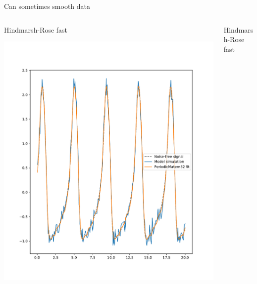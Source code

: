 \documentclass[presentation]{beamer}
\begin{document}
\begin{frame}[plain,label={sec:orga64bea2}]{Can sometimes smooth data}
\begin{columns}
\begin{column}{0.5\columnwidth}
\begin{center}
Hindmarsh-Rose fast
\end{center}

\begin{center}
\includegraphics[width=1.1\textwidth]{./Matern1.pdf}
\end{center}
\end{column}

\begin{column}{0.5\columnwidth}
\begin{center}
Hindmarsh-Rose fast
\end{center}


\end{column}
\end{columns}
\end{frame}
\end{document}
